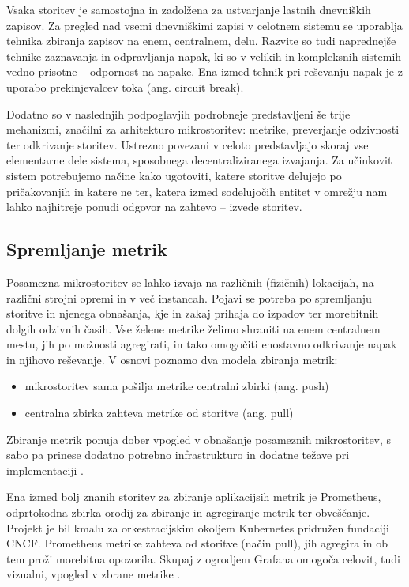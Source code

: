 \documentclass[a4paper, 12pt]{book}
\begin{document}
Vsaka storitev je samostojna in zadolžena za ustvarjanje lastnih dnevniških zapisov.
Za pregled nad vsemi dnevniškimi zapisi v celotnem sistemu se uporablja tehnika zbiranja zapisov na enem, centralnem, delu.
Razvite so tudi naprednejše tehnike zaznavanja in odpravljanja napak, ki so v velikih in kompleksnih sistemih vedno prisotne -- odpornost na napake.
Ena izmed tehnik pri reševanju napak je z uporabo prekinjevalcev toka (ang. circuit break)\cite{sarcMag}.

Dodatno so v naslednjih podpoglavjih podrobneje predstavljeni še trije mehanizmi, značilni za arhitekturo mikrostoritev: metrike, preverjanje odzivnosti ter odkrivanje storitev.
Ustrezno povezani v celoto predstavljajo skoraj vse elementarne dele sistema, sposobnega decentraliziranega izvajanja.
Za učinkovit sistem potrebujemo načine kako ugotoviti, katere storitve delujejo po pri\-ča\-ko\-va\-njih in katere ne ter, katera izmed sodelujočih entitet v omrežju nam lahko najhitreje ponudi odgovor na zahtevo -- izvede storitev.

\subsection{Spremljanje metrik}

Posamezna mikrostoritev se lahko izvaja na različnih (fizičnih) lokacijah, na različni strojni opremi in v več instancah.
Pojavi se potreba po spremljanju storitve in njenega obnašanja, kje in zakaj prihaja do izpadov ter morebitnih dolgih odzivnih časih.
Vse želene metrike želimo shraniti na enem centralnem mestu, jih po možnosti agregirati, in tako omogočiti enostavno odkrivanje napak in njihovo reševanje.
V osnovi poznamo dva modela zbiranja metrik: 
\begin{itemize}
	\item mikrostoritev sama pošilja metrike centralni zbirki (ang. push)
	\item centralna zbirka zahteva metrike od storitve (ang. pull)
\end{itemize}

Zbiranje metrik ponuja dober vpogled v obnašanje posameznih mikrostoritev, s sabo pa prinese dodatno potrebno infrastrukturo in dodatne težave pri implementaciji \cite{ApplicationMetrics}.


Ena izmed bolj znanih storitev za zbiranje aplikacijsih metrik je Prometheus, odprtokodna zbirka orodij za zbiranje in agregiranje metrik ter obveščanje.
Projekt je bil kmalu za orkestracijskim okoljem Kubernetes pridružen fundaciji CNCF.
Prometheus metrike zahteva od storitve (način pull), jih agregira in ob tem proži morebitna opozorila.
Skupaj z ogrodjem Grafana omogoča celovit, tudi vizualni, vpogled v zbrane metrike \cite{Prometheus}.
\end{document}
